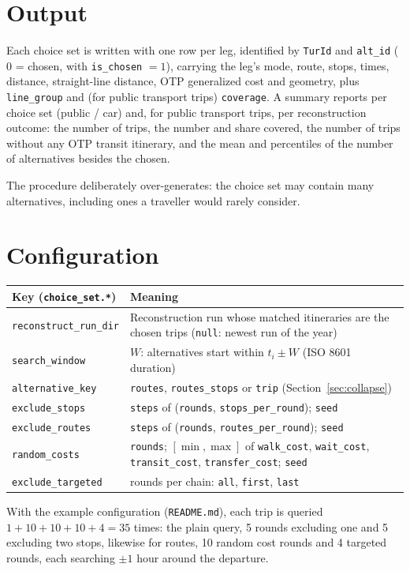 \documentclass[11pt,a4paper]{article}
\newcommand{\code}[1]{\texttt{#1}}
\begin{document}
\section{Output}

Each choice set is written with one row per leg, identified by \code{TurId} and \code{alt\_id}
($0$ = chosen, with \code{is\_chosen} $=1$), carrying the leg's mode, route, stops, times, distance,
straight-line distance, OTP generalized cost and geometry, plus \code{line\_group} and (for public
transport trips) \code{coverage}. A summary reports per choice set (public / car) and, for public
transport trips, per reconstruction outcome: the number of trips, the number and share covered, the
number of trips without any OTP transit itinerary, and the mean and percentiles of the number of
alternatives besides the chosen.

The procedure deliberately over-generates: the choice set may contain many alternatives, including
ones a traveller would rarely consider.

\section{Configuration}

\begin{center}
\begin{tabularx}{\linewidth}{@{}lX@{}}
\toprule
Key (\code{choice\_set.*}) & Meaning \\
\midrule
\code{reconstruct\_run\_dir} & Reconstruction run whose matched itineraries are the chosen trips
  (\code{null}: newest run of the year) \\
\code{search\_window} & $W$: alternatives start within $t_i \pm W$ (ISO 8601 duration) \\
\code{alternative\_key} & \code{routes}, \code{routes\_stops} or \code{trip} (Section~\ref{sec:collapse}) \\
\code{exclude\_stops} & \code{steps} of (\code{rounds}, \code{stops\_per\_round}); \code{seed} \\
\code{exclude\_routes} & \code{steps} of (\code{rounds}, \code{routes\_per\_round}); \code{seed} \\
\code{random\_costs} & \code{rounds}; $[\min,\max]$ of \code{walk\_cost}, \code{wait\_cost},
  \code{transit\_cost}, \code{transfer\_cost}; \code{seed} \\
\code{exclude\_targeted} & rounds per chain: \code{all}, \code{first}, \code{last} \\
\bottomrule
\end{tabularx}
\end{center}

With the example configuration (\code{README.md}), each trip is queried $1 + 10 + 10 + 10 + 4 = 35$
times: the plain query, 5 rounds excluding one and 5 excluding two stops, likewise for routes, 10
random cost rounds and 4 targeted rounds, each searching $\pm 1$ hour around the departure.
\end{document}
